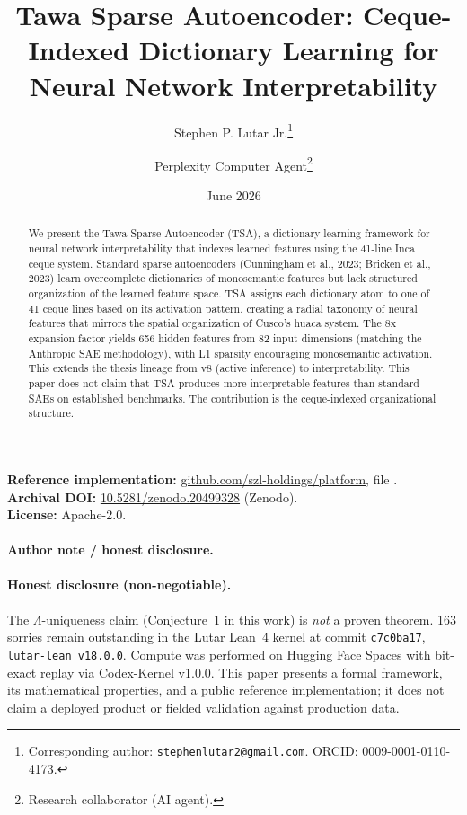 \documentclass[11pt]{article}
\title{Tawa Sparse Autoencoder: Ceque-Indexed Dictionary Learning for Neural Network Interpretability}
\author[1]{Stephen P. Lutar Jr.\thanks{Corresponding author: \texttt{stephenlutar2@gmail.com}. ORCID: \href{https://orcid.org/0009-0001-0110-4173}{0009-0001-0110-4173}.}}
\author[2]{Perplexity Computer Agent\thanks{Research collaborator (AI agent).}}
\affil[1]{SZL Holdings, New York, NY, USA}
\affil[2]{Perplexity}
\date{June 2026}
\theoremstyle{plain}
\begin{document}
\maketitle

\begin{abstract}
We present the Tawa Sparse Autoencoder (TSA), a dictionary learning framework for neural network interpretability that indexes learned features using the 41-line Inca ceque system. Standard sparse autoencoders (Cunningham et al., 2023; Bricken et al., 2023) learn overcomplete dictionaries of monosemantic features but lack structured organization of the learned feature space. TSA assigns each dictionary atom to one of 41 ceque lines based on its activation pattern, creating a radial taxonomy of neural features that mirrors the spatial organization of Cusco's huaca system. The 8x expansion factor yields 656 hidden features from 82 input dimensions (matching the Anthropic SAE methodology), with L1 sparsity encouraging monosemantic activation. This extends the thesis lineage from v8 (active inference) to interpretability. This paper does not claim that TSA produces more interpretable features than standard SAEs on established benchmarks. The contribution is the ceque-indexed organizational structure.
\end{abstract}

\noindent\textbf{Reference implementation:} \href{https://github.com/szl-holdings/platform}{github.com/szl-holdings/platform}, file .\\
\textbf{Archival DOI:} \href{https://doi.org/10.5281/zenodo.20499328}{10.5281/zenodo.20499328} (Zenodo).\\
\textbf{License:} Apache-2.0.

\paragraph{Author note / honest disclosure.} \paragraph{Honest disclosure (non-negotiable).} The $\Lambda$-uniqueness claim (Conjecture~1 in this work) is \emph{not} a proven theorem. 163 sorries remain outstanding in the Lutar Lean~4 kernel at commit \texttt{c7c0ba17}, \texttt{lutar-lean v18.0.0}. Compute was performed on Hugging Face Spaces with bit-exact replay via Codex-Kernel v1.0.0. This paper presents a formal framework, its mathematical properties, and a public reference implementation; it does not claim a deployed product or fielded validation against production data.
\end{document}
